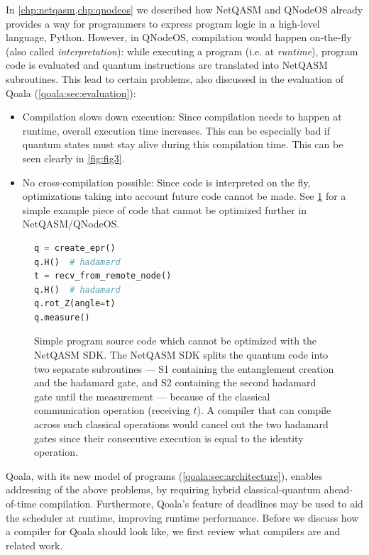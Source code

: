 In \cref{chp:netqasm,chp:qnodeos} we described how NetQASM and QNodeOS already provides a way for programmers to express program logic in a high-level language, Python.
However, in \ac{QNodeOS}, compilation would happen on-the-fly (also called \emph{interpretation}):
while executing a program (i.e. at \emph{runtime}), program code is evaluated and quantum instructions are translated into NetQASM subroutines.
This lead to certain problems, also discussed in the evaluation of Qoala (\cref{qoala:sec:evaluation}):
\begin{itemize}
  \item Compilation slows down execution:
    Since compilation needs to happen at runtime, overall execution time increases.
    This can be especially bad if quantum states must stay alive during this compilation time.
    This can be seen clearly in \cref{fig:fig3}.
  \item No cross-compilation possible:
    Since code is interpreted on the fly, optimizations taking into account future code cannot be made. See \cref{compiler:lst:hybrid} for a simple example piece of code that cannot be optimized further in NetQASM/QNodeOS.
\end{itemize}

\begin{figure}[t]
  \centering
  \begin{lstlisting}[language=Python]
q = create_epr()
q.H()  # hadamard
t = recv_from_remote_node()
q.H()  # hadamard
q.rot_Z(angle=t)
q.measure()
  \end{lstlisting}
  \caption{Simple program source code which cannot be optimized with the NetQASM SDK.
    The NetQASM SDK splits the quantum code into two separate subroutines ---
    S1 containing the entanglement creation and the hadamard gate, and
    S2 containing the second hadamard gate until the measurement ---
    because of the classical communication operation (receiving $t$).
    A compiler that can compile across such classical operations would cancel out the two hadamard gates since their consecutive execution is equal to the identity operation.
  }
  \label{compiler:lst:hybrid}
\end{figure}


Qoala, with its new model of programs (\cref{qoala:sec:architecture}), enables addressing of the above problems, by requiring hybrid classical-quantum ahead-of-time compilation.
Furthermore, Qoala's feature of deadlines may be used to aid the scheduler at runtime, improving runtime performance.
Before we discuss how a compiler for Qoala should look like, we first review what compilers are and related work.


